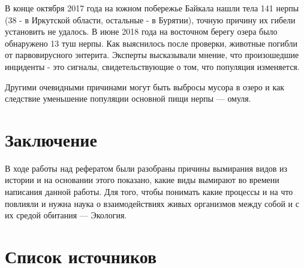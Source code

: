 \documentclass[12pt]{article}
\begin{document}
    В конце октября 2017 года на южном побережье Байкала нашли тела 141 нерпы (38 - в Иркутской области, остальные - в Бурятии), точную причину их гибели установить не удалось. В июне 2018 года на восточном берегу озера было обнаружено 13 туш нерпы. Как выяснилось после проверки, животные погибли от парвовирусного энтерита. Эксперты высказывали мнение, что произошедшие инциденты - это сигналы, свидетельствующие о том, что популяция изменяется.

    Другими очевидными причинами могут быть выбросы мусора в озеро и как следствие уменьшение популяции основной пищи нерпы --- омуля.

    \newpage
    \section*{Заключение}

    В ходе работы над рефератом были разобраны причины вымирания видов из истории и на основании этого показано, какие виды вымирают во времени написания данной работы. Для того, чтобы понимать какие процессы и на что повлияли и нужна наука о взаимодействиях живых организмов между собой и с их средой обитания --- Экология.

    \newpage
    \section*{Список источников}
\end{document}
